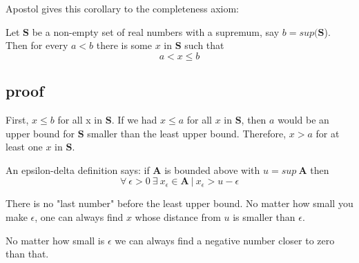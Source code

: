 \documentclass[11pt, oneside]{article}
\begin{document}
Apostol gives this corollary to the completeness axiom:  

Let $\mathbf{S}$ be a non-empty set of real numbers with a supremum, say $b = sup(\mathbf{S}$).  Then for every $a < b$ there is some $x$ in $\mathbf{S}$ such that
\[ a < x \le b \]

\subsection*{proof}

First, $x \le b$ for all x in $\mathbf{S}$.  If we had $x \le a$ for all $x$ in $\mathbf{S}$, then $a$ would be an upper bound for $\mathbf{S}$ smaller than the least upper bound.  Therefore, $x > a$ for at least one $x$ in $\mathbf{S}$.

An epsilon-delta definition says:  if $\mathbf{A}$ is bounded above with $u = sup \ \mathbf{A}$ then
\[ \forall \ \epsilon > 0 \ \exists \ x_{\epsilon} \in  \mathbf{A} \ | \  x_{\epsilon} > u - \epsilon \]

There is no "last number" before the least upper bound.  No matter how small you make $\epsilon$, one can always find $x$ whose distance from $u$ is smaller than $\epsilon$.

No matter how small is $\epsilon$ we can always find a negative number closer to zero than that.
\end{document}
